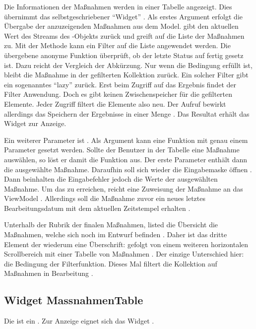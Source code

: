 Die Informationen der Maßnahmen werden in einer Tabelle angezeigt.
Dies übernimmt das selbstgeschriebener \enquote{Widget}  .
Als erstes Argument erfolgt die Übergabe der anzuzeigenden Maßnahmen aus dem Model.  gibt den aktuellen Wert des Streams des -Objekts zurück und greift auf die Liste der Maßnahmen zu. Mit der Methode   kann ein Filter auf die Liste angewendet werden. Die übergebene anonyme Funktion    überprüft, ob der letzte Status auf fertig gesetz ist. Dazu reicht der Vergleich der Abkürzung. Nur wenn die Bedingung erfüllt ist, bleibt die Maßnahme in der gefilterten Kollektion zurück. Ein solcher Filter gibt ein sogenanntes \enquote{lazy}  zurück. Erst beim Zugriff auf das Ergebnis findet der Filter Anwendung. Doch es gibt keinen Zwischenspeicher für die gefilterten Elemente. Jeder Zugriff filtert die Elemente also neu. Der Aufruf  bewirkt allerdings das Speichern der Ergebnisse in einer Menge . Das Resultat erhält das Widget  zur Anzeige.

Ein weiterer Parameter ist  .
Als Argument kann eine Funktion mit genau einem Parameter gesetzt werden.
Sollte der Benutzer in der Tabelle eine Maßnahme auswählen, so löst er damit die Funktion aus.
Der erste Parameter enthält dann die ausgewählte Maßnahme.
Daraufhin soll sich wieder die Eingabemaske öffnen .
Dann beinhalten die Eingabefehler jedoch die Werte der ausgewählten Maßnahme.  Um das zu erreichen, reicht eine Zuweisung der Maßnahme an das ViewModel . Allerdings soll die Maßnahme zuvor ein neues letztes Bearbeitungsdatum mit dem aktuellen Zeitstempel erhalten .

Unterhalb der Rubrik der finalen Maßnahmen, listed die Übersicht die Maßnahmen, welche sich noch im Entwurf befinden .
Daher ist das dritte Element der  wiederum eine Überschrift:   gefolgt von einem weiteren horizontalen Scrollbereich  mit einer Tabelle von Maßnahmen .
Der einzige Unterschied hier: die Bedingung der Filterfunktion.
Dieses Mal filtert die Kollektion auf Maßnahmen in Bearbeitung .
\ifincludeall \clearpage \fi


\subsection{Widget MassnahmenTable}

Die  ist ein   .
Zur Anzeige eignet sich das Widget  . 



